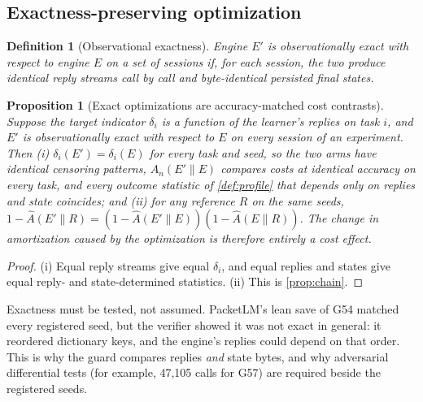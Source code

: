 \documentclass[11pt]{article}
\newtheorem{definition}{Definition}
\newtheorem{proposition}{Proposition}
\theoremstyle{remark}
\begin{document}
\subsection{Exactness-preserving optimization}\label{sec:exact}
\begin{definition}[Observational exactness]\label{def:exact}
Engine $E'$ is \emph{observationally exact} with respect to engine $E$ on a set of sessions if, for each session, the two produce identical reply streams call by call and byte-identical persisted final states.
\end{definition}
\begin{proposition}[Exact optimizations are accuracy-matched cost contrasts]\label{prop:exact}
Suppose the target indicator $\delta_i$ is a function of the learner's replies on task $i$, and $E'$ is observationally exact with respect to $E$ on every session of an experiment. Then (i) $\delta_i(E')=\delta_i(E)$ for every task and seed, so the two arms have identical censoring patterns, $A_n(E'\|E)$ compares costs at identical accuracy on every task, and every outcome statistic of \cref{def:profile} that depends only on replies and state coincides; and (ii) for any reference $R$ on the same seeds, $1-\hat A(E'\|R)=(1-\hat A(E'\|E))(1-\hat A(E\|R))$. The change in amortization caused by the optimization is therefore entirely a cost effect.
\end{proposition}
\begin{proof}
(i) Equal reply streams give equal $\delta_i$, and equal replies and states give equal reply- and state-determined statistics. (ii) This is \cref{prop:chain}.
\end{proof}
Exactness must be tested, not assumed. PacketLM's lean save of G54 matched every registered seed, but the verifier showed it was not exact in general: it reordered dictionary keys, and the engine's replies could depend on that order. This is why the guard compares replies \emph{and} state bytes, and why adversarial differential tests (for example, 47{,}105 calls for G57) are required beside the registered seeds.
\end{document}
